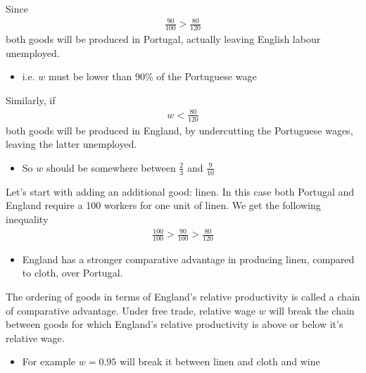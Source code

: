 \documentclass{beamer}
\begin{document}
\begin{frame}
  Since
  \begin{align*}
    \frac{90}{100} > \frac{80}{120}
  \end{align*}
  \medskip
  both goods will be produced in Portugal, actually leaving English labour unemployed.
  \begin{itemize}
    \item i.e. $w$ must be lower than 90\% of the Portuguese wage
  \end{itemize}
  \medskip
  Similarly, if 
  \begin{align*}
      w<\frac{80}{120}    
  \end{align*}
  \medskip
  both goods will be produced in England, by undercutting the Portuguese wages, leaving the latter unemployed.\\
  \begin{itemize}
    \item So $w$ should be somewhere between $\frac{2}{3}$ and $\frac{9}{10}$
  \end{itemize}
\end{frame}

\begin{frame}
  Let's start with adding an additional good: linen. 
  In this case both Portugal and England require a 100 workers for one unit of linen. 
  We get the following inequality
  \begin{align*}
    \frac{100}{100} > \frac{90}{100} > \frac{80}{120}
  \end{align*}
  \begin{itemize}
    \item England has a stronger comparative advantage in producing linen, compared to cloth, over Portugal. 
  \end{itemize}
  \medskip  
  The ordering of goods in terms of England's relative productivity is called a chain of comparative advantage. 
  Under free trade, relative wage $w$ will break the chain between goods for which England's relative productivity is above or below it's relative wage. 
  \begin{itemize}
    \item For example $w=0.95$ will break it between linen and cloth and wine
  \end{itemize}  
\end{frame}
\end{document}
